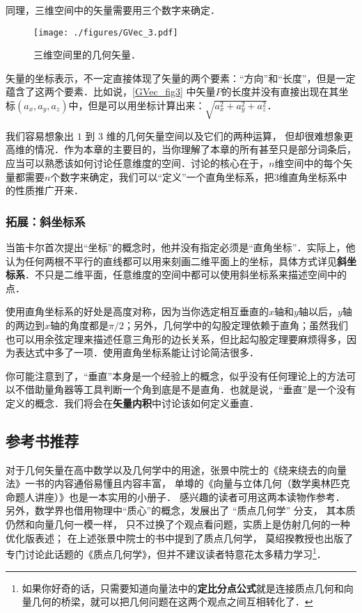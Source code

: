同理，三维空间中的矢量需要用三个数字来确定．

\begin{figure}[ht]
\centering
\texttt{[image: ./figures/GVec\_3.pdf]}
\caption{三维空间里的几何矢量．} \label{GVec_fig3}
\end{figure}

矢量的坐标表示，不一定直接体现了矢量的两个要素：“方向”和“长度”，但是一定蕴含了这两个要素．比如说，\autoref{GVec_fig3} 中矢量$P$的长度并没有直接出现在其坐标$(a_x, a_y, a_z)$中，但是可以用坐标计算出来：$\sqrt{a_x^2+a_y^2+a_z^2}$．

我们容易想象出 $1$ 到 $3$ 维的几何矢量空间以及它们的两种运算， 但却很难想象更高维的情况．作为本章的主要目的，当你理解了本章的所有甚至只是部分词条后，应当可以熟悉该如何讨论任意维度的空间．讨论的核心在于，$n$维空间中的每个矢量都需要$n$个数字来确定，我们可以“定义”一个直角坐标系，把$3$维直角坐标系中的性质推广开来．

\subsubsection{拓展：斜坐标系}

当笛卡尔首次提出“坐标”的概念时，他并没有指定必须是“直角坐标”．实际上，他认为任何两根不平行的直线都可以用来刻画二维平面上的坐标，具体方式详见\textbf{斜坐标系}．不只是二维平面，任意维度的空间中都可以使用斜坐标系来描述空间中的点．

使用直角坐标系的好处是高度对称，因为当你选定相互垂直的$x$轴和$y$轴以后，$y$轴的两边到$x$轴的角度都是$\pi/2$；另外，几何学中的勾股定理依赖于直角；虽然我们也可以用余弦定理来描述任意三角形的边长关系，但比起勾股定理要麻烦得多，因为表达式中多了一项．使用直角坐标系能让讨论简洁很多．

你可能注意到了，“垂直”本身是一个经验上的概念，似乎没有任何理论上的方法可以不借助量角器等工具判断一个角到底是不是直角．也就是说，“垂直”是一个没有定义的概念．我们将会在\textbf{矢量内积}中讨论该如何定义垂直．



\subsection{参考书推荐}
对于几何矢量在高中数学以及几何学中的用途，张景中院士的《绕来绕去的向量法》一书的内容通俗易懂且内容丰富， 单墫的《向量与立体几何（数学奥林匹克命题人讲座）》也是一本实用的小册子． 感兴趣的读者可用这两本读物作参考． 另外，数学界也借用物理中“质心”的概念，发展出了 “质点几何学” 分支， 其本质仍然和向量几何一模一样， 只不过换了个观点看问题，实质上是仿射几何的一种优化版表述； 在上述张景中院士的书中提到了质点几何学， 莫绍揆教授也出版了专门讨论此话题的《质点几何学》，但并不建议读者特意花太多精力学习\footnote{如果你好奇的话，只需要知道向量法中的\textbf{定比分点公式}就是连接质点几何和向量几何的桥梁，就可以把几何问题在这两个观点之间互相转化了．}．









